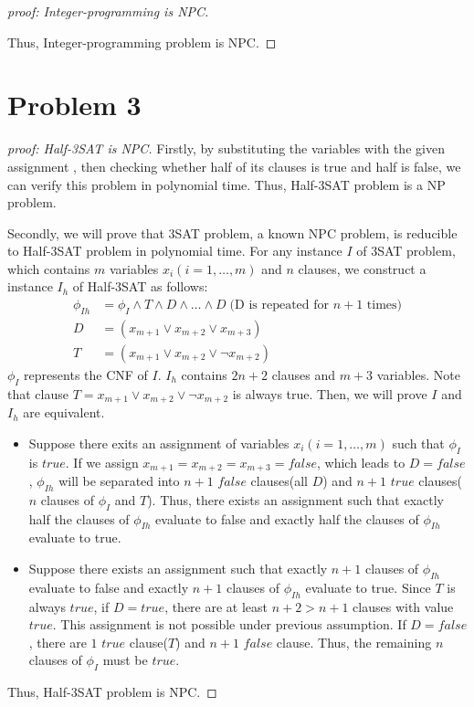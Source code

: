 \documentclass[]{article}
\begin{document}
\begin{proof}[proof: Integer-programming is NPC]
\begin{itemize}
        \end{itemize}
        \item Thus, Integer-programming problem is NPC.
        \end{proof}
        
        
        
    \section{Problem 3}
        \begin{proof}[proof: Half-3SAT is NPC]
        \item Firstly, by substituting the variables with the given assignment , then checking whether half of its clauses is true and half is false, we can verify this problem in polynomial time. Thus, Half-3SAT problem is a NP problem.
        \item Secondly, we will prove that 3SAT problem, a known NPC problem, is reducible to Half-3SAT problem in polynomial time. For any instance $I$ of 3SAT problem, which contains $m$ variables $x_i(i = 1,\dots,m)$ and $n$ clauses, we construct a instance $I_h$ of Half-3SAT as follows: 
        \begin{align}
       \phi_{Ih} &= \phi_I \wedge T \wedge D \wedge \dots \wedge D \; \text{(D is repeated for }n+1 \text{ times)}   \\
        D &= (x_{m+1} \vee x_{m+2} \vee x_{m+3}) \\
        T &= (x_{m+1} \vee x_{m+2} \vee \neg x_{m+2})
        \end{align}                
        $\phi_I$ represents the CNF of $I$. $I_h$ contains $2n+2$ clauses and $m+3$ variables. Note that clause $T = x_{m+1} \vee x_{m+2} \vee \neg x_{m+2}$ is always true. Then, we will prove $I$ and $I_h$ are equivalent.
        \begin{itemize}
        \item Suppose there exits an assignment of variables $x_i(i = 1,\dots,m)$ such that $\phi_I$ is $true$. If we assign $x_{m+1} = x_{m+2} = x_{m+3} = false$, which leads to $D=false$, $\phi_{Ih}$ will be separated into $n+1$ $false$ clauses(all $D$) and $n+1$ $true$ clauses($n$ clauses of $\phi_I$ and $T$). Thus, there exists an assignment such that exactly half the clauses of $\phi_{Ih}$ evaluate to false and exactly half the clauses of $\phi_{Ih}$ evaluate to true.
        \item Suppose there exists an assignment such that exactly $n+1$ clauses of $\phi_{Ih}$ evaluate to false and exactly $n+1$ clauses of $\phi_{Ih}$ evaluate to true. Since $T$ is always $true$, if $D=true$, there are at least $n+2 > n+1$ clauses with value $true$. This assignment is not possible under previous assumption. If $D=false$, there are $1$ $true$ clause($T$) and $n+1$ $false$ clause. Thus, the remaining $n$ clauses of $\phi_I$ must be $true$.
        \end{itemize}
        \item Thus, Half-3SAT problem is NPC.
        \end{proof}
\end{document}
